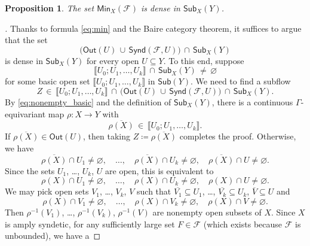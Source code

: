 \documentclass[11pt,reqno,psamsfonts]{amsart}
\theoremstyle{bfnote}
\newtheorem{prop}[theo]{Proposition}
\theoremstyle{definition}
\theoremstyle{remark}
\newcommand{\0}{\varnothing}
\newcommand{\defeq}{\coloneqq}
\newcommand{\G}{\Gamma}
\newcommand{\Sub}{\mathsf{Sub}}
\newcommand{\Out}{\mathsf{Out}}
\newcommand{\sr}{amply syndetic\xspace}
\newcommand{\Synd}{\mathsf{Synd}}
\newcommand{\Min}{\mathsf{Min}}
\numberwithin{equation}{section}
\newenvironment{scproof}[1][]{\begin{proof}[\textsc{\upshape{Proof}}#1]}{\end{proof}}
\begin{document}
    \begin{prop}\label{prop:dense}
        The set $\Min_X(\mathcal{F})$ is dense in $\Sub_X(Y)$.
    \end{prop}
    \begin{scproof}
        Thanks to formula \eqref{eq:min} and the Baire category theorem, it suffices to argue that the set
        \[
            \big(\Out(U) \,\cup\, \Synd(\mathcal{F}, U)\big) \,\cap\, \Sub_X(Y)
        \]
        is dense in $\Sub_X(Y)$ for every open $U \subseteq Y$. %
        To this end, suppose %
        \begin{equation}\label{eq:nonempty_basic}
            \llbracket U_0; U_1, \ldots, U_k \rrbracket \,\cap\, \Sub_X(Y) \,\neq \,\0
        \end{equation}
        for some basic open set $\llbracket U_0; U_1, \ldots, U_k \rrbracket$ in $\Sub(Y)$. We need to find a subflow
        \[%
            Z \,\in\, \llbracket U_0; U_1, \ldots, U_k \rrbracket \,\cap\, \big(\Out(U) \,\cup\, \Synd(\mathcal{F}, U)\big) \,\cap\, \Sub_X(Y).
        \]%
        By \eqref{eq:nonempty_basic} and the definition of $\Sub_X(Y)$, there is a continuous $\G$-equivariant map $\rho \colon X \to Y$ with
        \[
            \overline{\rho(X)} \,\in\, \llbracket U_0; U_1, \ldots, U_k \rrbracket.
        \]
        If $\overline{\rho(X)} \in \Out(U)$, then taking $Z \defeq \overline{\rho(X)}$ completes the proof. Otherwise, we have
        \[
            \overline{\rho(X)} \cap U_1 \neq \0, \quad \ldots, \quad \overline{\rho(X)} \cap U_k \neq \0, \quad \overline{\rho(X)} \cap U \neq \0.
        \]
        Since the sets $U_1$, \ldots, $U_k$, $U$ are open, this is equivalent to
        \[
            {\rho(X)} \cap U_1 \neq \0, \quad \ldots, \quad {\rho(X)} \cap U_k \neq \0, \quad {\rho(X)} \cap U \neq \0.
        \]
        We may pick open sets $V_1$, \ldots, $V_k$, $V$ such that $\overline{V_1} \subseteq U_1$, \ldots, $\overline{V_k} \subseteq U_k$, $\overline{V} \subseteq U$ and
        \[
            {\rho(X)} \cap V_1 \neq \0, \quad \ldots, \quad {\rho(X)} \cap V_k \neq \0, \quad {\rho(X)} \cap V \neq \0.
        \]
        Then $\rho^{-1}(V_1)$, \ldots, $\rho^{-1}(V_k)$, $\rho^{-1}(V)$ are nonempty open subsets of $X$. Since $X$ is \sr, for any sufficiently large set $F \in \mathcal{F}$ (which exists because $\mathcal{F}$ is unbounded), we have a

\end{scproof}
\end{document}
